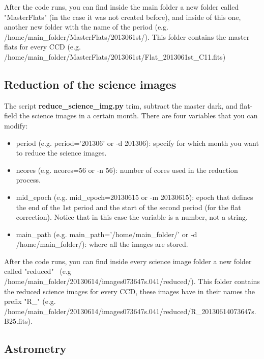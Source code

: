 \documentclass[letter, 12pt]{article}
\begin{document}
After the code runs, you can find inside the main folder a new folder called "MasterFlats" (in the case it was not created before), and inside of this one, another new folder with the name of the period (e.g. /home/main\_folder/MasterFlats/2013061st/). This folder contains the master flats for every CCD (e.g. /home/main\_folder/MasterFlats/2013061st/Flat\_2013061st\_C11.fits)


\subsection{Reduction of the science images}

The script \textbf{reduce\_science\_img.py} trim, subtract the master dark, and flat-field the science images in a certain month. 
There are four variables that you can modify:

\begin{itemize}

\item period (e.g. period='201306' or -d 201306): specify for which month you want to reduce the science images.

\item ncores (e.g. ncores=56 or -n 56): number of cores used in the reduction process.

\item mid\_epoch (e.g. mid\_epoch=20130615 or -m 20130615): epoch that defines the end of the 1st period and the start of the second period (for the flat correction). Notice that in this case the variable is a number, not a string.

\item main\_path (e.g. main\_path='/home/main\_folder/' or -d  /home/main\_folder/): where all the images are stored.

\end{itemize}

After the code runs, you can find inside every science image folder a new folder called "reduced"  
\ (e.g /home/main\_folder/20130614/images073647s.041/reduced/). This folder contains the reduced science images for every CCD, these images have in their names the prefix "R\_"  (e.g. \\ /home/main\_folder/20130614/images073647s.041/reduced/R\_20130614073647s.B25.fits).

\subsection{Astrometry}
\end{document}
